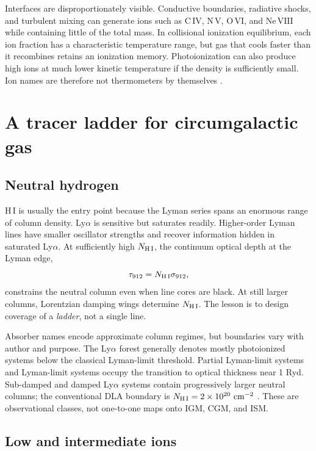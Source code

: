 Interfaces are disproportionately visible. Conductive boundaries,
radiative shocks, and turbulent mixing can generate ions such as
$\mathrm{C\,IV}$, $\mathrm{N\,V}$, $\mathrm{O\,VI}$, and
$\mathrm{Ne\,VIII}$ while containing little of the total mass. In
collisional ionization equilibrium, each ion fraction has a characteristic
temperature range, but gas that cools faster than it recombines retains an
ionization memory. Photoionization can also produce high ions at much
lower kinetic temperature if the density is sufficiently small. Ion names
are therefore not thermometers by themselves
\citep{GnatSternberg2007,SutherlandDopita1993}.

\section{A tracer ladder for circumgalactic gas}

\subsection{Neutral hydrogen}

$\mathrm{H\,I}$ is usually the entry point because the Lyman series spans an
enormous range of column density. Ly$\alpha$ is sensitive but saturates
readily. Higher-order Lyman lines have smaller oscillator strengths and
recover information hidden in saturated Ly$\alpha$. At sufficiently high
$N_{\rm H\,I}$, the continuum optical depth at the Lyman edge,
\begin{equation}
 \tau_{912}=N_{\rm H\,I}\sigma_{912},
\end{equation}
constrains the neutral column even when line cores are black. At still larger
columns, Lorentzian damping wings determine $N_{\rm H\,I}$. The lesson is to
design coverage of a \emph{ladder}, not a single line.

Absorber names encode approximate column regimes, but boundaries vary with
author and purpose. The Ly$\alpha$ forest generally denotes mostly
photoionized systems below the classical Lyman-limit threshold. Partial
Lyman-limit systems and Lyman-limit systems occupy the transition to optical
thickness near 1 Ryd. Sub-damped and damped Ly$\alpha$ systems contain
progressively larger neutral columns; the conventional DLA boundary is
$N_{\rm H\,I}=2\times10^{20}\ {\rm cm^{-2}}$
\citep{Wolfe2005}. These are observational classes, not one-to-one maps onto
IGM, CGM, and ISM.

\subsection{Low and intermediate ions}

